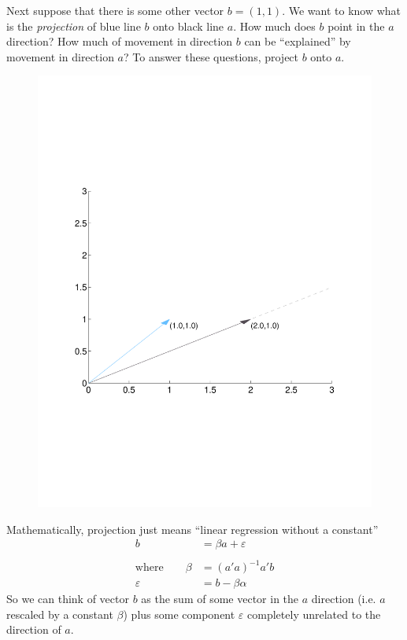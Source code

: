 \documentclass[12pt]{article}
\theoremstyle{plain}
\theoremstyle{definition}
\theoremstyle{remark}
\begin{document}
Next suppose that there is some other vector $b=(1,1)$. We want to know
what is the \emph{projection} of blue line $b$ onto black line $a$.
How much does $b$ point in the $a$ direction? How much of movement in
direction $b$ can be ``explained'' by movement in direction $a$?
To answer these questions, project $b$ onto $a$.
\begin{figure}[htpb!]
  \centering
  \includegraphics[scale=0.5, trim={2cm, 7cm, 2cm, 7cm}, clip]{Plots/StateSpaceGeometry2.pdf}
\end{figure}

Mathematically, projection just means ``linear regression without a
constant''
\begin{align*}
  b &= \beta a + \varepsilon \\\\
  \text{where}\qquad
  \beta &= (a'a)^{-1}a'b\\
  \varepsilon &= b - \beta \alpha
\end{align*}
So we can think of vector $b$ as the sum of some vector in the $a$
direction (i.e. $a$ rescaled by a constant $\beta$) plus some component
$\varepsilon$ completely unrelated to the direction of $a$.
\end{document}
